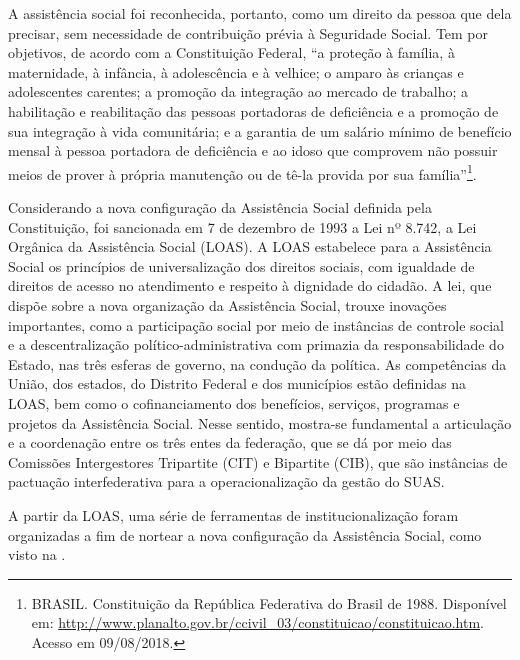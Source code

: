 \documentclass[
  brazilian]{report}
\begin{document}
A assistência social foi reconhecida, portanto, como um direito da
pessoa que dela precisar, sem necessidade de contribuição prévia à
Seguridade Social. Tem por objetivos, de acordo com a Constituição
Federal, ``a proteção à família, à maternidade, à infância, à
adolescência e à velhice; o amparo às crianças e adolescentes carentes;
a promoção da integração ao mercado de trabalho; a habilitação e
reabilitação das pessoas portadoras de deficiência e a promoção de sua
integração à vida comunitária; e a garantia de um salário mínimo de
benefício mensal à pessoa portadora de deficiência e ao idoso que
comprovem não possuir meios de prover à própria manutenção ou de tê-la
provida por sua
família''\footnote{BRASIL. Constituição da República Federativa do Brasil de 1988. Disponível em: \url{http://www.planalto.gov.br/ccivil_03/constituicao/constituicao.htm}. Acesso em 09/08/2018.}.

Considerando a nova configuração da Assistência Social definida pela
Constituição, foi sancionada em 7 de dezembro de 1993 a Lei nº 8.742, a
Lei Orgânica da Assistência Social (LOAS). A LOAS estabelece para a
Assistência Social os princípios de universalização dos direitos
sociais, com igualdade de direitos de acesso no atendimento e respeito à
dignidade do cidadão. A lei, que dispõe sobre a nova organização da
Assistência Social, trouxe inovações importantes, como a participação
social por meio de instâncias de controle social e a descentralização
político-administrativa com primazia da responsabilidade do Estado, nas
três esferas de governo, na condução da política. As competências da
União, dos estados, do Distrito Federal e dos municípios estão definidas
na LOAS, bem como o cofinanciamento dos benefícios, serviços, programas
e projetos da Assistência Social. Nesse sentido, mostra-se fundamental a
articulação e a coordenação entre os três entes da federação, que se dá
por meio das Comissões Intergestores Tripartite (CIT) e Bipartite (CIB),
que são instâncias de pactuação interfederativa para a operacionalização
da gestão do SUAS.

A partir da LOAS, uma série de ferramentas de institucionalização foram
organizadas a fim de nortear a nova configuração da Assistência Social,
como visto na .

\begin{table}[h]
\caption{Marcos legais da Assistência Social no Brasil.}
\label{tab:marcos}
\end{table}
\end{document}
